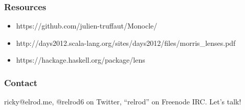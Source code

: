 \documentclass{beamer}
\begin{document}
\begin{frame}[fragile]
  \frametitle{Resources}
  \begin{itemize}
    \item https://github.com/julien-truffaut/Monocle/
    \item http://days2012.scala-lang.org/sites/days2012/files/morris\_lenses.pdf
    \item https://hackage.haskell.org/package/lens
  \end{itemize}
\end{frame}

\begin{frame}[fragile]
  \frametitle{Contact}
  ricky@elrod.me, @relrod6 on Twitter, ``relrod'' on Freenode IRC. Let's talk!
\end{frame}
\end{document}
